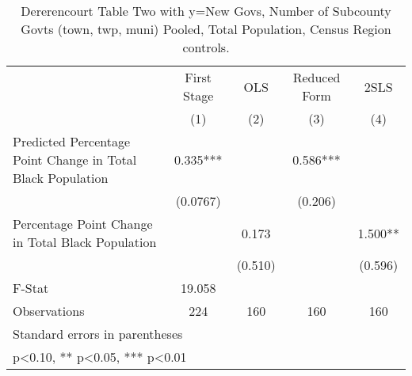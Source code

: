 \begin{table}[htbp]\centering
\def\sym#1{\ifmmode^{#1}\else\(^{#1}\)\fi}
\caption{Dererencourt Table Two with y=New Govs, Number of Subcounty Govts (town, twp, muni)  Pooled, Total Population, Census Region controls.}
\begin{tabular}{l*{4}{c}}
\toprule
                    & First Stage   &         OLS   &Reduced Form   &        2SLS   \\
                    &\multicolumn{1}{c}{(1)}   &\multicolumn{1}{c}{(2)}   &\multicolumn{1}{c}{(3)}   &\multicolumn{1}{c}{(4)}   \\
\midrule
Predicted Percentage Point Change in Total Black Population&       0.335***&               &       0.586***&               \\
                    &    (0.0767)   &               &     (0.206)   &               \\
\addlinespace
Percentage Point Change in Total Black Population&               &       0.173   &               &       1.500** \\
                    &               &     (0.510)   &               &     (0.596)   \\
\midrule
F-Stat              &      19.058   &               &               &               \\
Observations        &         224   &         160   &         160   &         160   \\
\bottomrule
\multicolumn{5}{l}{\footnotesize Standard errors in parentheses}\\
\multicolumn{5}{l}{\footnotesize * p<0.10, ** p<0.05, *** p<0.01}\\
\end{tabular}
\end{table}
